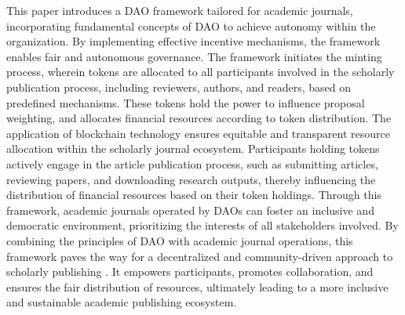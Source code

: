 \documentclass[lettersize,journal]{IEEEtran}
\begin{document}
This paper introduces a DAO framework tailored for academic journals, incorporating fundamental concepts of DAO to achieve autonomy within the organization. By implementing effective incentive mechanisms, the framework enables fair and autonomous governance. The framework initiates the minting process, wherein tokens are allocated to all participants involved in the scholarly publication process, including reviewers, authors, and readers, based on predefined mechanisms. These tokens hold the power to influence proposal weighting, and allocates financial resources according to token distribution.
The application of blockchain technology ensures equitable and transparent resource allocation within the scholarly journal ecosystem. Participants holding tokens actively engage in the article publication process, such as submitting articles, reviewing papers, and downloading research outputs, thereby influencing the distribution of financial resources based on their token holdings. Through this framework, academic journals operated by DAOs can foster an inclusive and democratic environment, prioritizing the interests of all stakeholders involved.
By combining the principles of DAO with academic journal operations, this framework paves the way for a decentralized and community-driven approach to scholarly publishing \cite{10426804}. It empowers participants, promotes collaboration, and ensures the fair distribution of resources, ultimately leading to a more inclusive and sustainable academic publishing ecosystem.
\end{document}
